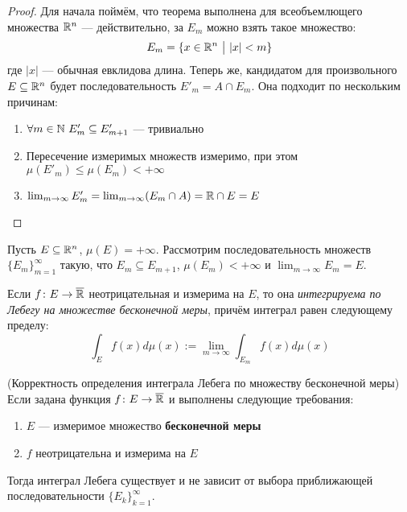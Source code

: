 \begin{proof}
	Для начала поймём, что теорема выполнена для всеобъемлющего множества $\mathbb{R}^n$ --- действительно, за $E_m$ можно взять такое множество:
	\[
		E_m = \{x \in \mathbb{R}^n \ \big|\  |x| < m\}
	\]
	где $|x|$ --- обычная евклидова длина. Теперь же, кандидатом для произвольного $E \subseteq \mathbb{R}^n$ будет последовательность $E'_m = A \cap E_m$. Она подходит по нескольким причинам:
	\begin{enumerate}
		\item $\forall m \in \mathbb{N}\ E'_m \subseteq E'_{m + 1}$ --- тривиально
		
		\item Пересечение измеримых множеств измеримо, при этом $\mu(E'_m) \le \mu(E_m) < +\infty$
		
		\item $\lim_{m \to \infty} E'_m = \lim_{m \to \infty} (E_m \cap A) = \mathbb{R} \cap E = E$
	\end{enumerate}
\end{proof}

\begin{definition}
	Пусть $E \subseteq \mathbb{R}^n$, $\mu(E) = +\infty$. Рассмотрим последовательность множеств $\{E_m\}_{m = 1}^\infty$ такую, что $E_m \subseteq E_{m + 1}$, $\mu(E_m) < +\infty$ и $\lim_{m \to \infty} E_m = E$.
	
	Если $f \colon E \to \overline{\mathbb{R}}$ неотрицательная и измерима на $E$, то она \textit{интегрируема по Лебегу на множестве бесконечной меры}, причём интеграл равен следующему пределу:
	\[
		\int_E f(x)d\mu(x) := \lim_{m \to \infty} \int_{E_m} f(x)d\mu(x)
	\]
\end{definition}

\begin{theorem} (Корректность определения интеграла Лебега по множеству бесконечной меры)
	Если задана функция $f \colon E \to \overline{\mathbb{R}}$ и выполнены следующие требования:
	\begin{enumerate}
		\item $E$ --- измеримое множество \textbf{бесконечной меры}
		
		\item $f$ неотрицательна и измерима на $E$
	\end{enumerate}
	Тогда интеграл Лебега существует и не зависит от выбора приближающей последовательности $\{E_k\}_{k = 1}^\infty$.
\end{theorem}

